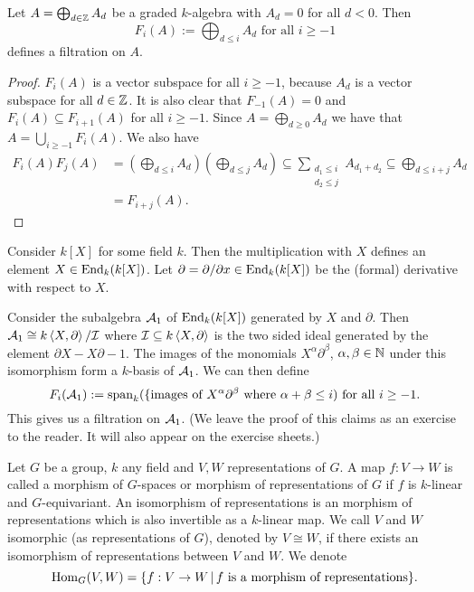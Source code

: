 \begin{lem}
 Let $A = \bigoplus_{d \in \mathbb{Z}} A_d$ be a graded $k$-algebra with $A_d = 0$ for all $d < 0$. Then
 \[
  F_i(A) := \bigoplus_{d \leq i} A_d \text{ for all } i \geq -1
 \]
 defines a filtration on $A$.
\end{lem}
\begin{proof}
 $F_i(A)$ is a vector subspace for all $i \geq -1$, because $A_d$ is a vector subspace for all $d \in \mathbb{Z}$. It is also clear that $F_{-1}(A) = 0$ and $F_i(A) \subseteq F_{i+1}(A)$ for all $i \geq -1$. Since $A = \bigoplus_{d \geq 0} A_d$ we have that $A = \bigcup_{i \geq -1} F_i(A)$. We also have
 \begin{align*}
  F_i(A) F_j(A)
  &= \left( \bigoplus_{d \leq i} A_d \right) \left( \bigoplus_{d \leq j} A_d \right)
  \subseteq \sum_{\substack{d_1 \leq i \\ d_2 \leq j}} A_{d_1 + d_2}
  \subseteq \bigoplus_{d \leq i+j} A_d \\
  &= F_{i+j}(A).
 \end{align*}
\end{proof}


\begin{expl}
 Consider $k[X]$ for some field $k$. Then the multiplication with $X$ defines an element $X \in \operatorname{End}_k(k[X])$. Let $\partial = \partial/\partial x \in \operatorname{End}_k(k[X])$ be the (formal) derivative with respect to $X$.
 
 Consider the subalgebra $\mathcal{A}_1$ of $\operatorname{End}_k(k[X])$ generated by $X$ and $\partial$. Then $\mathcal{A}_1 \cong k\left\langle X,\partial \right\rangle/\mathcal{I}$ where $\mathcal{I} \subseteq k \left\langle X,\partial \right\rangle$ is the two sided ideal generated by the element $\partial X - X \partial - 1$. The images of the monomials $X^\alpha \partial^\beta$, $\alpha, \beta \in \mathbb{N}$ under this isomorphism form a $k$-basis of $\mathcal{A}_1$. We can then define
 \[
  F_i(\mathcal{A}_1) := \operatorname{span}_k(\{\text{images of $X^\alpha \partial^\beta$ where $\alpha+\beta \leq i$}) \text{ for all } i \geq -1.
 \]
 This gives us a filtration on $\mathcal{A}_1$. (We leave the proof of this claims as an exercise to the reader. It will also appear on the exercise sheets.)
\end{expl}

\begin{defi}
Let $G$ be a group, $k$ any field and $V,W$ representations of $G$. A map $f : V \to W$ is called a morphism of $G$-spaces or morphism  of representations of $G$ if $f$ is $k$-linear and $G$-equivariant. An isomorphism of representations is an morphism of representations which is also invertible as a $k$-linear map. We call $V$ and $W$ isomorphic (as representations of $G$), denoted by $V \cong W$, if there exists an isomorphism of representations between $V$ and $W$. We denote
\[
 \operatorname{Hom}_G(V,W) = \{f : V \to W \,|\, f \text{ is a morphism of representations}\}.
\]
\end{defi}


